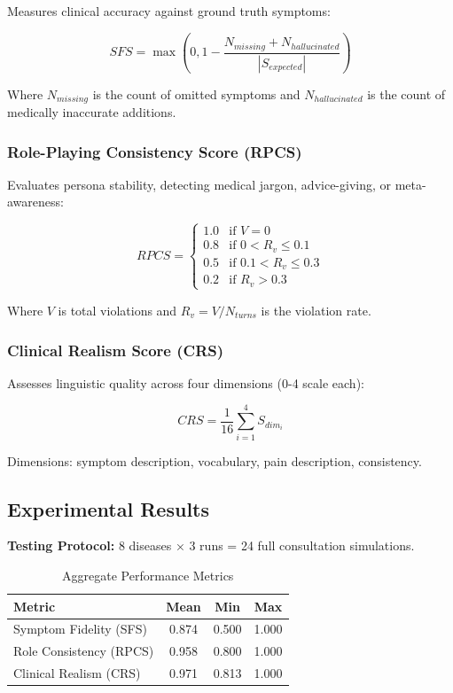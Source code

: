 \documentclass[runningheads,a4paper,11pt]{report}
\begin{document}
Measures clinical accuracy against ground truth symptoms:

\begin{equation}
SFS = \max\left(0, 1 - \frac{N_{missing} + N_{hallucinated}}{|S_{expected}|}\right)
\end{equation}

Where $N_{missing}$ is the count of omitted symptoms and $N_{hallucinated}$ is the count of medically inaccurate additions.

\subsubsection{Role-Playing Consistency Score (RPCS)}

Evaluates persona stability, detecting medical jargon, advice-giving, or meta-awareness:

\begin{equation}
RPCS = \begin{cases}
1.0 & \text{if } V = 0\\
0.8 & \text{if } 0 < R_v \leq 0.1\\
0.5 & \text{if } 0.1 < R_v \leq 0.3\\
0.2 & \text{if } R_v > 0.3
\end{cases}
\end{equation}

Where $V$ is total violations and $R_v = V/N_{turns}$ is the violation rate.

\subsubsection{Clinical Realism Score (CRS)}

Assesses linguistic quality across four dimensions (0-4 scale each):

\begin{equation}
CRS = \frac{1}{16}\sum_{i=1}^{4} S_{dim_i}
\end{equation}

Dimensions: symptom description, vocabulary, pain description, consistency.

\subsection{Experimental Results}

\textbf{Testing Protocol:} 8 diseases × 3 runs = 24 full consultation simulations.

\begin{table}[htbp]
\caption{Aggregate Performance Metrics}
\label{tab:aggregateMetrics}
\begin{center}
\begin{tabular}{|l|c|c|c|}
\hline
\textbf{Metric} & \textbf{Mean} & \textbf{Min} & \textbf{Max} \\
\hline
Symptom Fidelity (SFS) & 0.874 & 0.500 & 1.000 \\
Role Consistency (RPCS) & 0.958 & 0.800 & 1.000 \\
Clinical Realism (CRS) & 0.971 & 0.813 & 1.000 \\
\hline
\end{tabular}
\end{center}
\end{table}
\end{document}

